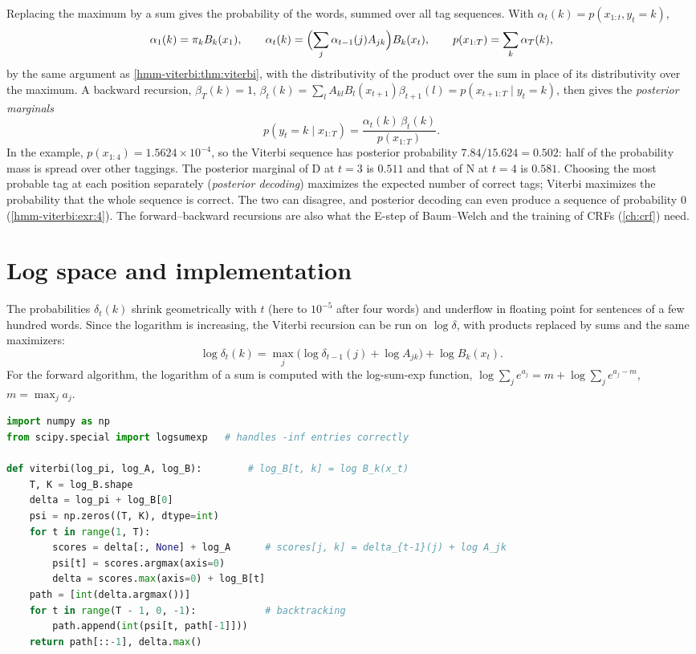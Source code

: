 \begin{notechapter}
Replacing the maximum by a sum gives the probability of the words, summed over all tag
sequences. With $\alpha_t(k) = p(x_{1:t}, y_t = k)$,
\[
  \alpha_1(k) = \pi_kB_k(x_1),\qquad\alpha_t(k) = \Bigl(\sum_j\alpha_{t-1}(j)A_{jk}\Bigr)B_k(x_t),\qquad p(x_{1:T}) = \sum_k\alpha_T(k),
\]
by the same argument as \cref{hmm-viterbi:thm:viterbi}, with the distributivity of the product over
the sum in place of its distributivity over the maximum. A backward recursion,
$\beta_T(k) = 1$, $\beta_t(k) = \sum_lA_{kl}B_l(x_{t+1})\beta_{t+1}(l) = p(x_{t+1:T}\mid y_t = k)$, then gives the \emph{posterior marginals}
\[
  p(y_t = k\mid x_{1:T}) = \frac{\alpha_t(k)\,\beta_t(k)}{p(x_{1:T})} .
\]
In the example, $p(x_{1:4}) = 1.5624\times10^{-4}$, so the Viterbi sequence has posterior probability $7.84/15.624 = 0.502$:
half of the probability mass is spread over other taggings. The posterior marginal of D at $t = 3$
is $0.511$ and that of N at $t = 4$ is $0.581$. Choosing the most probable tag at each position separately
(\emph{posterior decoding}) maximizes the expected number of correct tags; Viterbi maximizes the
probability that the whole sequence is correct. The two can disagree, and posterior decoding
can even produce a sequence of probability $0$ (\cref{hmm-viterbi:exr:4}). The forward--backward
recursions are also what the E-step of Baum--Welch and the training of CRFs
(\cref{ch:crf}) need.

\section{Log space and implementation}\label{hmm-viterbi:sec:code}

The probabilities $\delta_t(k)$ shrink geometrically with $t$ (here to $10^{-5}$ after four words) and underflow
in floating point for sentences of a few hundred words. Since the logarithm is increasing, the
Viterbi recursion can be run on $\log\delta$, with products replaced by sums and the same maximizers:
\[
  \log\delta_t(k) = \max_j\bigl(\log\delta_{t-1}(j) + \log A_{jk}\bigr) + \log B_k(x_t) .
\]
For the forward algorithm, the logarithm of a sum is computed with the log-sum-exp function,
$\log\sum_je^{a_j} = m + \log\sum_je^{a_j - m}$, $m = \max_ja_j$.
\begin{lstlisting}[language=Python]
import numpy as np
from scipy.special import logsumexp   # handles -inf entries correctly

def viterbi(log_pi, log_A, log_B):        # log_B[t, k] = log B_k(x_t)
    T, K = log_B.shape
    delta = log_pi + log_B[0]
    psi = np.zeros((T, K), dtype=int)
    for t in range(1, T):
        scores = delta[:, None] + log_A      # scores[j, k] = delta_{t-1}(j) + log A_jk
        psi[t] = scores.argmax(axis=0)
        delta = scores.max(axis=0) + log_B[t]
    path = [int(delta.argmax())]
    for t in range(T - 1, 0, -1):            # backtracking
        path.append(int(psi[t, path[-1]]))
    return path[::-1], delta.max()


\end{lstlisting}
\end{notechapter}
